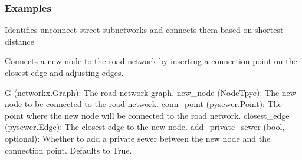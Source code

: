 \documentclass[letterpaper,10pt,english]{sphinxmanual}
\begin{document}
\begin{fulllineitems}
\begin{fulllineitems}
\subsubsection*{Examples}

\begin{sphinxVerbatim}[commandchars=\\\{\}]
  
 
\end{sphinxVerbatim}

\end{fulllineitems}


\begin{fulllineitems}
\label{\detokenize{pysewer:pysewer.preprocessing.ModelDomain.connect_subgraphs}}
\pysigstartsignatures
{}
\pysigstopsignatures
\sphinxAtStartPar
Identifies unconnect street subnetworks and connects them based on shortest distance

\end{fulllineitems}


\begin{fulllineitems}
\label{\detokenize{pysewer:pysewer.preprocessing.ModelDomain.connect_to_roadnetwork}}
\pysigstartsignatures
{}
\pysigstopsignatures
\sphinxAtStartPar
Connects a new node to the road network by inserting a connection point on the closest edge and adjusting edges.
\begin{description}
\sphinxAtStartPar
G (networkx.Graph): The road network graph.
new\_node (NodeTpye): The new node to be connected to the road network.
conn\_point (pysewer.Point): The point where the new node will be connected to the road network.
closest\_edge (pysewer.Edge): The closest edge to the new node.
add\_private\_sewer (bool, optional): Whether to add a private sewer between the new node and the connection point. Defaults to True.


\end{description}
\end{fulllineitems}
\end{fulllineitems}
\end{document}
